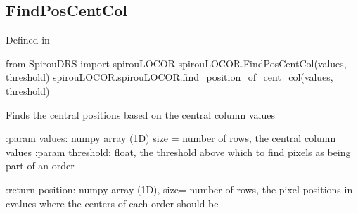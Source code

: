 \noindent\begin{minipage}{\textwidth}
\subsection{FindPosCentCol}

Defined in \spirouLOCOR{}

\begin{pythonbox}
from SpirouDRS import spirouLOCOR
spirouLOCOR.FindPosCentCol(values, threshold)
spirouLOCOR.spirouLOCOR.find_position_of_cent_col(values, threshold)
\end{pythonbox}

\begin{pythondocstring}
Finds the central positions based on the central column values

:param values: numpy array (1D) size = number of rows,
                the central column values
:param threshold: float, the threshold above which to find pixels as being
                  part of an order

:return position: numpy array (1D), size= number of rows,
                  the pixel positions in cvalues where the centers of each
                  order should be
\end{pythondocstring}
\end{minipage}

